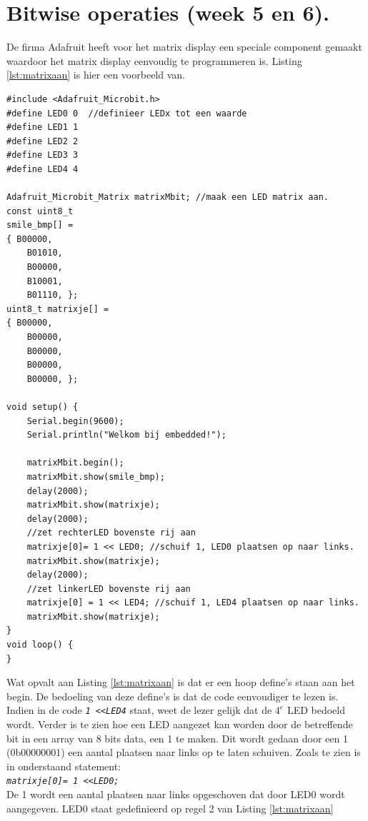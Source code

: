 
\chapter{Bitwise operaties \normalsize{(week 5 en 6)}. }
\label{chap:biw}

De firma Adafruit heeft voor het matrix display een speciale component gemaakt waardoor het matrix display eenvoudig te programmeren is. Listing \ref{lst:matrixaan} is hier een voorbeeld van.
\begin{lstlisting}[caption={Het aanzetten van een LED},label={lst:matrixaan}]
#include <Adafruit_Microbit.h>
#define LED0 0  //definieer LEDx tot een waarde
#define LED1 1
#define LED2 2
#define LED3 3
#define LED4 4

Adafruit_Microbit_Matrix matrixMbit; //maak een LED matrix aan.
const uint8_t
smile_bmp[] =
{ B00000,
	B01010,
	B00000,
	B10001,
	B01110, };
uint8_t matrixje[] =
{ B00000,
	B00000,
	B00000,
	B00000,
	B00000, };

void setup() {
	Serial.begin(9600);
	Serial.println("Welkom bij embedded!");
	
	matrixMbit.begin();
	matrixMbit.show(smile_bmp);
	delay(2000);
	matrixMbit.show(matrixje);
	delay(2000);  
	//zet rechterLED bovenste rij aan
	matrixje[0]= 1 << LED0; //schuif 1, LED0 plaatsen op naar links.
	matrixMbit.show(matrixje);
	delay(2000);  
	//zet linkerLED bovenste rij aan 
	matrixje[0] = 1 << LED4; //schuif 1, LED4 plaatsen op naar links.
	matrixMbit.show(matrixje);
}
void loop() {
}
\end{lstlisting}
Wat opvalt aan Listing \ref{lst:matrixaan} is dat er een hoop define's staan aan het begin. De bedoeling van deze define's is dat de code eenvoudiger te lezen is.
Indien in de code  \small{\texttt{\textit{1 \textless\textless  LED4}}} staat, weet de lezer gelijk dat de $4^{e}$ LED bedoeld wordt. Verder is te zien hoe een LED aangezet kan worden door de betreffende bit in een array van 8 bits data, een 1 te maken. Dit wordt gedaan door een 1 (0b00000001) een aantal plaatsen naar links op te laten schuiven. Zoals te zien is in onderstaand statement:\\
\texttt{\textit{matrixje[0]= 1 \textless\textless  LED0;}}\\
De 1 wordt een aantal plaatsen naar links opgeschoven dat door LED0 wordt aangegeven. LED0 staat gedefinieerd op regel 2 van Listing \ref{lst:matrixaan}
